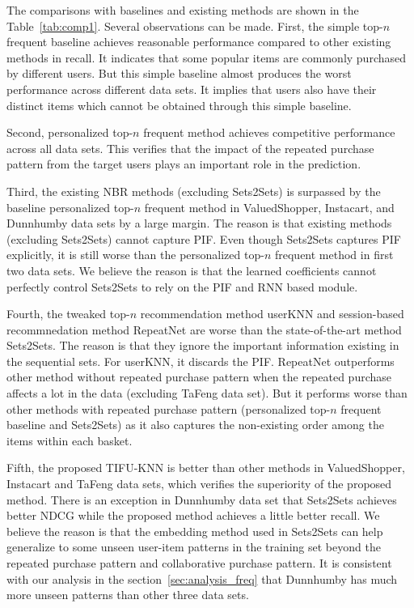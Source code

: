 \documentclass[sigconf]{acmart}
\begin{document}
The comparisons with baselines and existing  methods are shown in the Table~\ref{tab:comp1}. Several observations can be  made. First, the simple  top-$n$ frequent  baseline achieves  reasonable  performance  compared to other  existing methods in recall.  It indicates that  some popular items are commonly purchased by  different users. But this simple baseline almost produces the worst performance across different data sets. It implies that users also have their distinct items which cannot be obtained through this simple baseline. 

Second, personalized top-$n$ frequent  method achieves competitive performance across all data sets. This verifies that the impact of the repeated purchase pattern from  the target users plays an  important role in the  prediction. 

Third,  the existing NBR methods (excluding Sets2Sets) is  surpassed by the baseline  personalized top-$n$  frequent  method in ValuedShopper,  Instacart, and Dunnhumby data sets  by a large margin. The  reason is that existing methods  (excluding  Sets2Sets) cannot capture  PIF. Even though Sets2Sets  captures  PIF explicitly, it is still worse than the personalized top-$n$  frequent method in first two data sets.  We believe the reason is that the  learned coefficients cannot perfectly control Sets2Sets to rely on the PIF and RNN based module. 

Fourth, the tweaked top-$n$ recommendation method userKNN and session-based recommnedation method RepeatNet are worse than  the state-of-the-art  method Sets2Sets. The  reason is that they ignore the important information existing in the sequential sets. For userKNN, it discards the PIF. RepeatNet outperforms other method without repeated purchase  pattern when the repeated purchase affects a lot in the data (excluding TaFeng data set). But it performs worse than other methods with repeated purchase pattern (personalized  top-$n$ frequent baseline and Sets2Sets) as it also captures the non-existing order among the items within each basket. 

Fifth, the proposed  TIFU-KNN is better than other methods in  ValuedShopper,  Instacart and TaFeng data sets,  which verifies the  superiority of the proposed method. There is an exception in Dunnhumby data set that Sets2Sets  achieves better NDCG  while the proposed method achieves a little better recall. We believe the reason is that the embedding method used in  Sets2Sets can help generalize to some unseen user-item patterns in the training set beyond the repeated purchase pattern and collaborative purchase pattern. It is consistent with our analysis in the section~\ref{sec:analysis_freq} that Dunnhumby has much more unseen patterns than other three data sets. 
\end{document}
